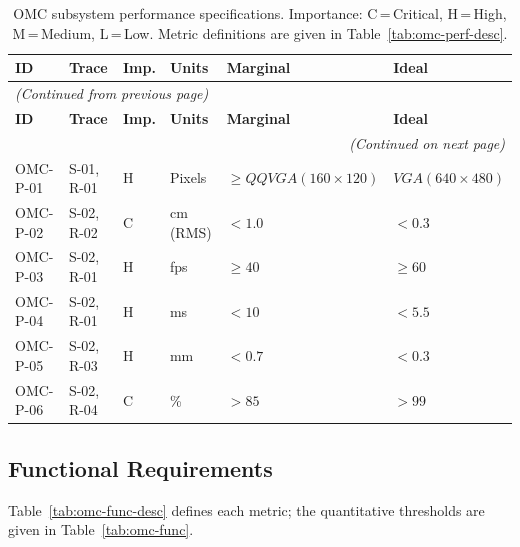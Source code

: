 {\small\setlength{\tabcolsep}{4pt}
\begin{longtable}{p{2.5cm} p{1.8cm} p{0.9cm} p{2.0cm} >{\raggedright\arraybackslash}p{\dimexpr(\linewidth-1.5cm-1.8cm-0.7cm-1.0cm-12\tabcolsep)/2\relax} >{\raggedright\arraybackslash}p{\dimexpr(\linewidth-1.5cm-1.8cm-0.7cm-1.0cm-12\tabcolsep)/2\relax}}
\caption[OMC subsystem performance specifications.]{OMC subsystem performance specifications. Importance: C\,=\,Critical, H\,=\,High, M\,=\,Medium, L\,=\,Low. Metric definitions are given in Table~\ref{tab:omc-perf-desc}.}
\label{tab:omc-perf}\\
\toprule
\textbf{ID} & \textbf{Trace} & \textbf{Imp.} & \textbf{Units} & \textbf{Marginal} & \textbf{Ideal} \\
\midrule
\endfirsthead
\multicolumn{6}{l}{\small\textit{(Continued from previous page)}}\\[2pt]
\toprule
\textbf{ID} & \textbf{Trace} & \textbf{Imp.} & \textbf{Units} & \textbf{Marginal} & \textbf{Ideal} \\
\midrule
\endhead
\midrule
\multicolumn{6}{r}{\small\textit{(Continued on next page)}}\\
\endfoot
\bottomrule
\endlastfoot
OMC-P-01 & S-01, R-01 & H & Pixels & $\geq QQVGA (160 \times 120)$ & $ VGA (640 \times 480)$ \\[4pt]
OMC-P-02 & S-02, R-02 & C & cm\,(RMS) & $< 1.0$ & $< 0.3$ \\[4pt]
OMC-P-03 & S-02, R-01 & H & fps & $\geq 40$ & $\geq 60$ \\[4pt]
OMC-P-04 & S-02, R-01 & H & ms & $< 10$ & $< 5.5$ \\[4pt]
OMC-P-05 & S-02, R-03 & H & mm & $< 0.7$ & $< 0.3$ \\[4pt]
OMC-P-06 & S-02, R-04 & C & \% & $> 85$ & $> 99$ \\
\end{longtable}}

\subsection{Functional Requirements}

Table~\ref{tab:omc-func-desc} defines each metric; the quantitative thresholds are given in Table~\ref{tab:omc-func}.

